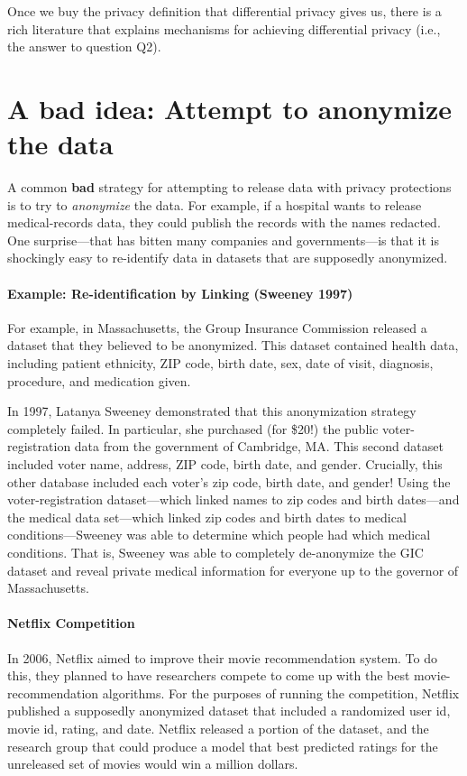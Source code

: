 Once we buy the privacy definition that differential privacy gives us,
there is a rich literature that explains mechanisms for achieving
differential privacy (i.e., the answer to question Q2).


\section{A bad idea: Attempt to anonymize the data}
A common \textbf{bad} strategy for attempting to release data
with privacy protections is to try to \emph{anonymize} 
the data. 
For example, if a hospital wants to release medical-records data,
they could publish the records with the names redacted.
One surprise---that has bitten many companies and governments---is
that it is shockingly easy to re-identify data in datasets that
are supposedly anonymized.


\paragraph{Example: Re-identification by Linking (Sweeney 1997)}
For example, in Massachusetts, the Group Insurance Commission released a dataset that they believed to be anonymized. This dataset contained health data, 
including patient ethnicity, ZIP code, birth date,
sex, date of visit, diagnosis, procedure, and
medication given.

In 1997, Latanya Sweeney demonstrated that this anonymization strategy completely failed.
In particular, she purchased (for \$20!) the public voter-registration data 
from the government of
Cambridge, MA. This second dataset included voter name, address, ZIP code, birth date, and gender.
Crucially, this other database included each voter's zip code, birth date, and gender!
Using the voter-registration dataset---which linked names to zip codes and birth dates---and the medical data set---which linked zip codes and birth dates to medical conditions---Sweeney
was able to determine which people had which medical conditions.
That is, Sweeney was able to completely
de-anonymize the GIC dataset and reveal private
medical information for everyone up to the
governor of Massachusetts.

\paragraph{Netflix Competition}
In 2006, Netflix aimed to improve their movie recommendation system. To do this, they 
planned to have researchers compete to come up with the best movie-recommendation algorithms.
For the purposes of running the competition, Netflix published a supposedly anonymized dataset that included a randomized user id, movie id, rating, and date. Netflix released a portion of the dataset, and the research group that could produce a model that best predicted ratings for the unreleased set of movies would win a million dollars. 

